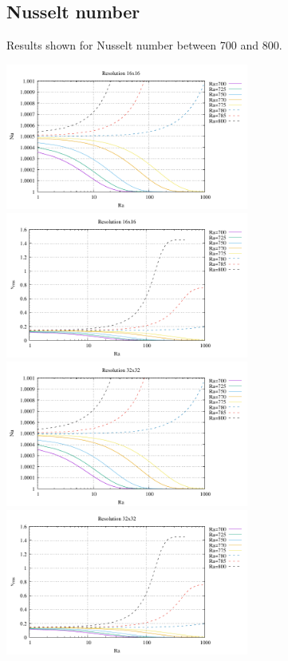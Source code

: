 \newpage
\subsection*{Nusselt number}

Results shown for Nusselt number between 700 and 800.

\begin{center}
\includegraphics[width=8cm]{python_codes/md/results_new/Nu_16x16}
\includegraphics[width=8cm]{python_codes/md/results_new/vrms_16x16}\\
\includegraphics[width=8cm]{python_codes/md/results_new/Nu_32x32}
\includegraphics[width=8cm]{python_codes/md/results_new/vrms_32x32}\\

\end{center}
